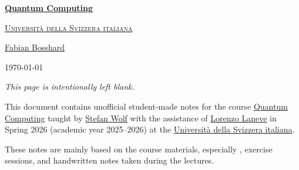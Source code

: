 \hypersetup{pageanchor=false}
\begin{titlepage}
\thispagestyle{empty}
\centering

\vspace*{5cm}
{\Huge\bfseries \href{https://search.usi.ch/en/courses/35275103/quantum-computing}{Quantum Computing}\par}
\vspace{0.5cm}
{\large\color{AccentGray}\href{https://www.usi.ch/en}{\textsc{Universit{\`a} della Svizzera italiana}}\par}
\vspace{1.5cm}

{\Large \href{https://fabianbosshard.github.io/}{Fabian Bosshard}\par}
\vfill
{\today\par}

\end{titlepage}

\thispagestyle{empty}
\vspace*{\fill}
\begin{center}\slshape
This page is intentionally left blank.
\end{center}
\vspace*{\fill}
\clearpage
\hypersetup{pageanchor=true}


\tableofcontents

\clearpage

{}

This document contains unofficial student-made notes for the course
\href{https://search.usi.ch/en/courses/35275103/quantum-computing}{Quantum Computing}
taught by
\href{https://search.usi.ch/people/eefbe656c9dfacf0e1a1e15bf8893bcb/wolf-stefan}{Stefan Wolf}
with the assistance of
\href{https://search.usi.ch/people/d98cefbb295f351a00dc05084f131aef/laneve-lorenzo}{Lorenzo Laneve}
in Spring 2026 (academic year 2025--2026) at the
\href{https://www.usi.ch/en}{Universit{\`a} della Svizzera italiana}.

These notes are mainly based on the course materials, especially 
\cite{aeschbacherHansenWolfQuantumInformatics}, 
exercise sessions, and handwritten notes taken during the lectures.

